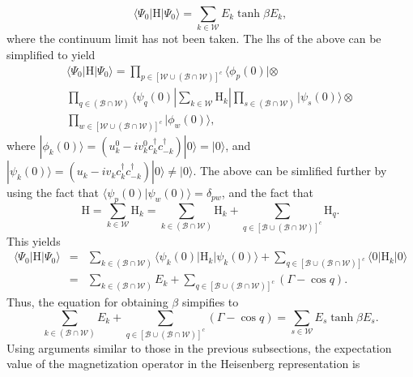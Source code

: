 \documentclass[a4paper,10pt]{article}
\begin{document}
\begin{equation}
\langle\Psi_0|\mathrm{H}|\Psi_0\rangle = \sum_{k\in\mathcal{W}}  E_k \tanh{\beta E_k},
\end{equation}
where the continuum limit has not been taken. The lhs of the above can be simplified to yield
\begin{multline}
\langle\Psi_0|\mathrm{H}|\Psi_0\rangle = \prod_{p\in{\left[\mathcal{W}\cup\left(\mathcal{B}\cap\mathcal{W}\right)\right]^c}} \langle\phi_p(0)| \otimes\\
\prod_{q\in{\left(\mathcal{B}\cap\mathcal{W}\right)}} \langle\psi_q(0)|\sum_{k\in\mathcal{W}}\mathrm{H}_k|\prod_{s\in{\left(\mathcal{B}\cap\mathcal{W}\right)}} |\psi_s(0)\rangle
\otimes\\
\prod_{w\in{\left[\mathcal{W}\cup\left(\mathcal{B}\cap\mathcal{W}\right)\right]^c}} |\phi_w(0)\rangle,
\end{multline}
where $|\phi_k(0)\rangle=(u^0_k-iv^0_kc^\dagger_kc^\dagger_{-k})|0\rangle=|0\rangle$, and $|\psi_k(0)\rangle=(u_k-iv_kc^\dagger_kc^\dagger_{-k})|0\rangle\neq|0\rangle$. The above can be simlified further by using the fact that $\langle\psi_p(0)|\psi_w(0)\rangle=\delta_{pw}$, and the fact that
\begin{equation}
\mathrm{H}=\sum_{k\in\mathcal{W}}\mathrm{H}_k=\sum_{k\in\left(\mathcal{B}\cap\mathcal{W}\right)}\mathrm{H}_k + \sum_{q\in\left[\mathcal{B}\cup\left(\mathcal{B}\cap\mathcal{W}\right)\right]^c }\mathrm{H}_q.
\end{equation}
This yields
\begin{eqnarray}
 \langle\Psi_0|\mathrm{H}|\Psi_0\rangle &=& \sum_{k\in\left(\mathcal{B}\cap\mathcal{W}\right)}\langle\psi_k(0)|\mathrm{H}_k|\psi_k(0)\rangle + \sum_{q\in\left[\mathcal{B}\cup\left(\mathcal{B}\cap\mathcal{W}\right)\right]^c}\langle0|\mathrm{H}_k|0\rangle \nonumber \\
                                        &=& \sum_{k\in\left(\mathcal{B}\cap\mathcal{W}\right)}E_k+\sum_{q\in\left[\mathcal{B}\cup\left(\mathcal{B}\cap\mathcal{W}\right)\right]^c}\left(\Gamma-\cos{q}\right).
\end{eqnarray}
Thus, the equation for obtaining $\beta$ simpifies to 
\begin{equation}
\label{eq:tempsolve3}
\sum_{k\in\left(\mathcal{B}\cap\mathcal{W}\right)}E_k + \sum_{q\in\left[\mathcal{B}\cup\left(\mathcal{B}\cap\mathcal{W}\right)\right]^c}\left(\Gamma-\cos{q}\right) = \sum_{s\in\mathcal{W}}  E_s \tanh{\beta E_s}.
\end{equation}
Using arguments similar to those in the previous subsections, the expectation value of the magnetization operator in the Heisenberg representation is
\end{document}
